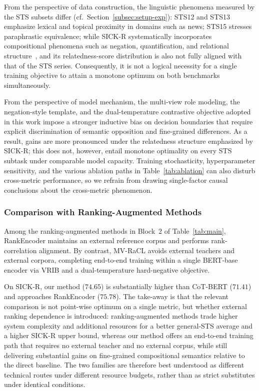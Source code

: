 \documentclass[lettersize,journal]{IEEEtran}
\begin{document}
From the perspective of data construction, the linguistic phenomena measured by the STS subsets differ (cf.\ Section~\ref{subsec:setup-exp}): STS12 and STS13 emphasize lexical and topical proximity in domains such as news; STS15 stresses paraphrastic equivalence; while SICK-R systematically incorporates compositional phenomena such as negation, quantification, and relational structure~\cite{sick}, and its relatedness-score distribution is also not fully aligned with that of the STS series. Consequently, it is not a logical necessity for a single training objective to attain a monotone optimum on both benchmarks simultaneously.

From the perspective of model mechanism, the multi-view role modeling, the negation-style template, and the dual-temperature contrastive objective adopted in this work impose a stronger inductive bias on decision boundaries that require explicit discrimination of semantic opposition and fine-grained differences. As a result, gains are more pronounced under the relatedness structure emphasized by SICK-R; this does not, however, entail monotone optimality on every STS subtask under comparable model capacity. Training stochasticity, hyperparameter sensitivity, and the various ablation paths in Table~\ref{tab:ablation} can also disturb cross-metric performance, so we refrain from drawing single-factor causal conclusions about the cross-metric phenomenon.

\subsubsection{Comparison with Ranking-Augmented Methods}

Among the ranking-augmented methods in Block~2 of Table~\ref{tab:main}, RankEncoder maintains an external reference corpus and performs rank-correlation alignment. By contrast, MV-RaCL avoids external teachers and external corpora, completing end-to-end training within a single BERT-base encoder via VRIB and a dual-temperature hard-negative objective.

On SICK-R, our method ($74.65$) is substantially higher than CoT-BERT ($71.41$) and approaches RankEncoder ($75.78$). The take-away is that the relevant comparison is not point-wise optimum on a single metric, but whether external ranking dependence is introduced: ranking-augmented methods trade higher system complexity and additional resources for a better general-STS average and a higher SICK-R upper bound, whereas our method offers an end-to-end training path that requires no external teacher and no external corpus, while still delivering substantial gains on fine-grained compositional semantics relative to the direct baseline. The two families are therefore best understood as different technical routes under different resource budgets, rather than as strict substitutes under identical conditions.
\end{document}

